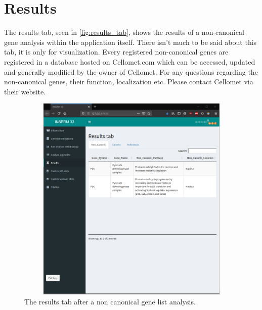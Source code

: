 \documentclass[11pt]{article}
\begin{document}
\newpage
\section{Results \label{res}}
The results tab, seen in \autoref{fig:results_tab}, shows the results of a non-canonical gene analysis within the application itself. There isn't much to be said about this tab, it is only for visualization.
Every registered non-canonical genes are registered in a database hosted on Cellomet.com which can be accessed, updated and generally modified by the owner of Cellomet. For any questions regarding the non-canonical genes, their function, localization etc. Please contact Cellomet via their website.

\begin{figure}[h!]
\centering
\includegraphics[width=15cm,height=10cm,keepaspectratio]{results_tab.png}
\caption{The results tab after a non canonical gene list analysis.}
\label{fig:results_tab}
\end{figure}

\newpage
\end{document}

